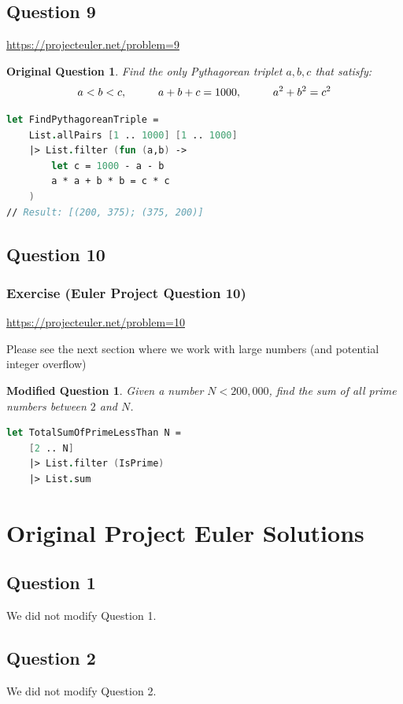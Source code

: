 \documentclass[12pt]{article}
\newtheorem*{modQuestion*}{Modified Question}
\newtheorem*{origQuestion*}{Original Question}
\begin{document}
\subsection*{Question 9} 
\url{https://projecteuler.net/problem=9}

\begin{origQuestion*}
Find the only Pythagorean triplet $a, b, c$ that satisfy:
\[
a < b < c, \hspace{1.0cm} a + b + c = 1000, \hspace{1.0cm} a^2 + b^2 = c^2
\]
\end{origQuestion*}
\begin{lstlisting}[language=FSharp]
let FindPythagoreanTriple =
    List.allPairs [1 .. 1000] [1 .. 1000]
    |> List.filter (fun (a,b) ->
        let c = 1000 - a - b
        a * a + b * b = c * c
    )
// Result: [(200, 375); (375, 200)]
\end{lstlisting}
\subsection*{Question 10} 

\subsubsection*{Exercise (Euler Project Question 10)}

\url{https://projecteuler.net/problem=10}

Please see the next section where we work with large numbers (and potential integer overflow)
\begin{modQuestion*}
Given a number $N < 200,000$, find the sum of all prime numbers between $2$ and $N$.
\end{modQuestion*}
\begin{lstlisting}[language=FSharp]
let TotalSumOfPrimeLessThan N =
    [2 .. N]
    |> List.filter (IsPrime)
    |> List.sum
\end{lstlisting}


\pagebreak
\section{Original Project Euler Solutions}
\subsection*{Question 1} 
We did not modify Question 1.
\subsection*{Question 2} 
We did not modify Question 2.
\end{document}
